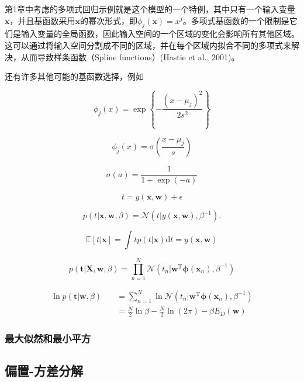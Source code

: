 \documentclass[a4paper]{article}
\begin{document}
第1章中考虑的多项式回归示例就是这个模型的一个特例，其中只有一个输入变量$\mathbf{x}$，并且基函数采用$\mathbf{x}$的幂次形式，即$\phi_{j}(\mathbf{x})=x^j$。多项式基函数的一个限制是它们是输入变量的全局函数，因此输入空间的一个区域的变化会影响所有其他区域。这可以通过将输入空间分割成不同的区域，并在每个区域内拟合不同的多项式来解决，从而导致样条函数（Spline functions）(Hastie et al., 2001)。

还有许多其他可能的基函数选择，例如

\begin{equation}
	\phi_j(x)=\exp\left\{-\frac{(x-\mu_j)^2}{2s^2}\right\} \tag{3.4}
\end{equation}

\begin{equation}
	\phi_j(x)=\sigma\left(\frac{x-\mu_j}s\right) \tag{3.5}
\end{equation}

\begin{equation}
	\sigma(a)=\frac1{1+\exp(-a)} \tag{3.6}
\end{equation}

\begin{equation}
	t=y(\mathbf{x},\mathbf{w})+\epsilon \tag{3.7}
\end{equation}

\begin{equation}
	p(t|\mathbf{x},\mathbf{w},\beta)=\mathcal{N}(t|y(\mathbf{x},\mathbf{w}),\beta^{-1}). \tag{3.8}
\end{equation}

\begin{equation}
	\mathbb{E}[t|\mathbf{x}]=\int tp(t|\mathbf{x})\mathrm{d}t=y(\mathbf{x},\mathbf{w}) \tag{3.9}
\end{equation}

\begin{equation}
	p(\mathbf{t}|\mathbf{X},\mathbf{w},\beta)=\prod_{n=1}^N\mathcal{N}(t_n|\mathbf{w}^\mathrm{T}\boldsymbol{\phi}(\mathbf{x}_n),\beta^{-1}) \tag{3.10}
\end{equation}

\begin{align*}
	\ln p(\mathbf{t}|\mathbf{w},\beta)\quad
	&=\sum_{n=1}^N\ln\mathcal{N}(t_n|\mathbf{w}^\mathrm{T}\boldsymbol{\phi}(\mathbf{x}_n),\beta^{-1}) \\
	&=\frac N2\ln\beta-\frac N2\ln(2\pi)-\beta E_D(\mathbf{w}) \tag{3.11}
\end{align*}

\subsubsection{最大似然和最小平方}

\subsection{偏置-方差分解}
\end{document}
